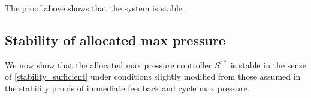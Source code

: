 The proof above shows that the system is stable.




\subsection*{Stability of allocated max pressure}

We now show that the allocated max pressure controller $S^{r*}$ is stable in the sense of \eqref{stability_sufficient} under conditions slightly modified from those assumed in the stability proofs of immediate feedback and cycle max pressure.





%
%
%
%



